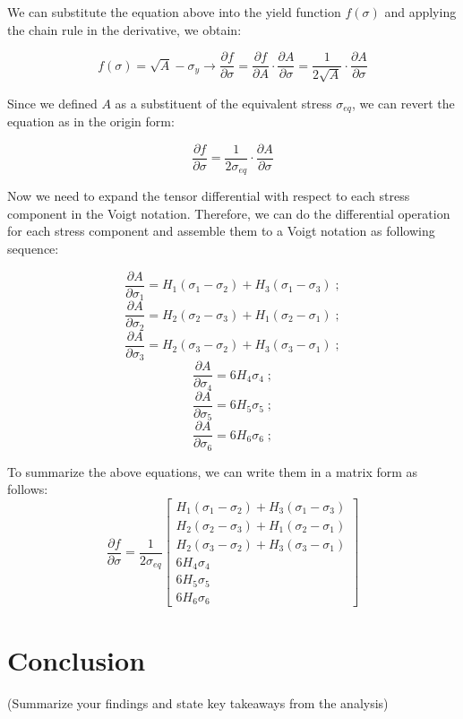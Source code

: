 \documentclass[12pt]{article}
\begin{document}
We can substitute the equation above into the yield function $f(\sigma)$ and applying the chain rule in the 
derivative, we obtain:

\begin{equation}
f(\sigma) = \sqrt{A} - \sigma_y \rightarrow \frac{\partial{f}}{\partial{\sigma}} = \frac{\partial{f}}{\partial{A}} \cdot \frac{\partial{A}}{\partial{\sigma}} = \frac{1}{2\sqrt{A}} \cdot \frac{\partial{A}}{\partial{\sigma}}
\end{equation}

Since we defined $A$ as a substituent of the equivalent stress $\sigma_{eq}$, we can revert the equation as in the origin form:

\begin{equation}
    \frac{\partial{f}}{\partial{\sigma}} = \frac{1}{2\sigma_{eq}} \cdot \frac{\partial{A}}{\partial{\sigma}}
\end{equation}

Now we need to expand the tensor differential with respect to each stress component in 
the Voigt notation. Therefore, we can do the differential operation for each stress 
component and assemble them to a Voigt notation as following sequence:

\[
\frac{\partial{A}}{\partial{\sigma_1}} = H_{1}(\sigma_1-\sigma_2) + H_3(\sigma_1-\sigma_3) \;;
\]
\[
\frac{\partial{A}}{\partial{\sigma_2}} = H_{2}(\sigma_2-\sigma_3) + H_1(\sigma_2-\sigma_1) \;;
\]
\[
\frac{\partial{A}}{\partial{\sigma_3}} = H_{2}(\sigma_3-\sigma_2) + H_3(\sigma_3-\sigma_1) \;;
\]
\[
\frac{\partial{A}}{\partial{\sigma_4}} = 6H_{4}\sigma_4 \;;
\]
\[
\frac{\partial{A}}{\partial{\sigma_5}} = 6H_{5}\sigma_5 \;;
\]
\[
\frac{\partial{A}}{\partial{\sigma_6}} = 6H_{6}\sigma_6 \;;
\]

To summarize the above equations, we can write them in a matrix form as follows:
\begin{equation}
\frac{\partial{f}}{\partial{\sigma}} = \frac{1}{2\sigma_{eq}}\begin{bmatrix}
H_{1}(\sigma_1-\sigma_2) + H_3(\sigma_1-\sigma_3) \\    
H_{2}(\sigma_2-\sigma_3) + H_1(\sigma_2-\sigma_1) \\
H_{2}(\sigma_3-\sigma_2) + H_3(\sigma_3-\sigma_1) \\
6H_{4}\sigma_4 \\
6H_{5}\sigma_5 \\
6H_{6}\sigma_6
\end{bmatrix}
\end{equation}




\section*{Conclusion}
(Summarize your findings and state key takeaways from the analysis)
\end{document}
